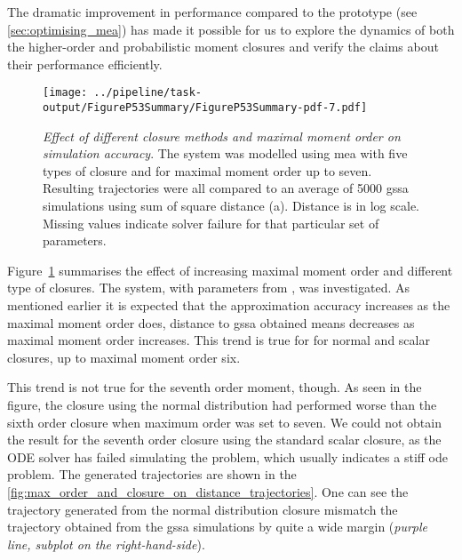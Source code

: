 The dramatic improvement in performance compared to the \mat{} prototype (see \autoref{sec:optimising_mea}) has made it possible for us to explore the dynamics of both the higher-order and probabilistic moment closures and verify the claims about their performance efficiently.

\begin{figure}[t]
    \centering
    \texttt{[image: ../pipeline/task-output/FigureP53Summary/FigureP53Summary-pdf-7.pdf]}
    \caption{\emph{Effect of different closure methods and maximal moment order on simulation accuracy}. The \pft system was modelled using \gls{mea} with five types of closure and for maximal moment order up to seven.
Resulting trajectories were all compared to an average of 5000 \gls{gssa} simulations using sum of square distance (a).
Distance is in log scale. Missing values indicate solver failure for that particular set of parameters.}
    \label{fig:max_order_and_closure_on_distance_summary}
\end{figure}


Figure~\ref{fig:max_order_and_closure_on_distance_summary} summarises the effect of increasing maximal moment order and different type of closures.
The \pft{} system, with parameters from \cite{ale_general_2013}, was investigated.
As mentioned earlier it is expected that the approximation accuracy increases as the maximal moment order does, \ie{} distance to \gls{gssa} obtained means decreases as maximal moment order increases. 
This trend is true for for normal and scalar closures, up to maximal moment order six. 

This trend is not true for the seventh order moment, though.
As seen in the figure, the closure using the normal distribution had performed worse than the sixth order closure when maximum order was set to seven.
We could not obtain the result for the seventh order closure using the standard scalar closure, as the ODE solver has failed simulating the problem, which usually indicates a stiff \gls{ode} problem. 
The generated trajectories are shown in the \autoref{fig:max_order_and_closure_on_distance_trajectories}. One can see the trajectory generated from the normal distribution closure mismatch the trajectory obtained from the \gls{gssa} simulations by quite a wide margin (\emph{purple line, subplot on the right-hand-side}). 

